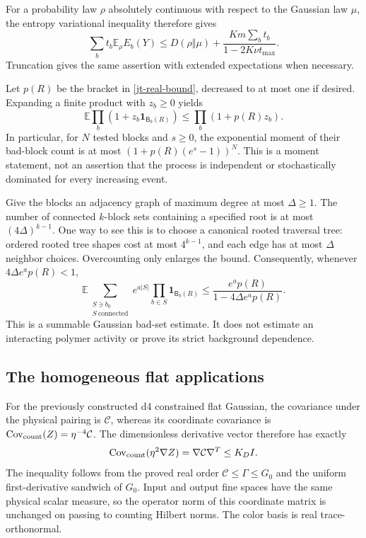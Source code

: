 \documentclass[11pt]{article}
\theoremstyle{remark}
\begin{document}
For a probability law $\rho$ absolutely continuous with respect
to the Gaussian law $\mu$, the entropy variational inequality
therefore gives
\begin{equation}\label{jt-relative-entropy}
 \sum_b t_b\mathbb E_\rho E_b(Y)
 \le D(\rho\Vert\mu)
       +\frac{Km\sum_b t_b}{1-2K\nu t_{\max}}.
\end{equation}
Truncation gives the same assertion with extended expectations
when necessary.

Let $p(R)$ be the bracket in \eqref{jt-real-bound}, decreased
to at most one if desired. Expanding a finite product with
$z_b\ge0$ yields
\begin{equation}\label{jt-bad-count-product}
 \mathbb E\prod_b(1+z_b\mathbf1_{\mathsf B_b(R)})
 \le\prod_b(1+p(R)z_b).
\end{equation}
In particular, for $N$ tested blocks and $s\ge0$, the
exponential moment of their bad-block count is at most
$(1+p(R)(e^s-1))^N$. This is a moment statement, not an
assertion that the process is independent or stochastically
dominated for every increasing event.

Give the blocks an adjacency graph of maximum degree at most
$\Delta\ge1$. The number of connected $k$-block sets containing
a specified root is at most $(4\Delta)^{k-1}$. One way to see
this is to choose a canonical rooted traversal tree: ordered
rooted tree shapes cost at most $4^{k-1}$, and each edge has
at most $\Delta$ neighbor choices. Overcounting only enlarges
the bound. Consequently, whenever $4\Delta e^a p(R)<1$,
\begin{equation}\label{jt-connected-sum}
 \boxed{\quad
 \mathbb E\sum_{\substack{S\ni b_0\\S\ \mathrm{connected}}}
 e^{a|S|}\prod_{b\in S}\mathbf1_{\mathsf B_b(R)}
 \le\frac{e^a p(R)}{1-4\Delta e^a p(R)}.
 \quad}
\end{equation}
This is a summable Gaussian bad-set estimate. It does not
estimate an interacting polymer activity or prove its strict
background dependence.

\subsection{The homogeneous flat applications}
\label{jt-flat-applications}

For the previously constructed d4 constrained flat Gaussian,
the covariance under the physical pairing is $\mathcal C$,
whereas its coordinate covariance is
$\operatorname{Cov}_{\rm count}(Z)=\eta^{-4}\mathcal C$.
The dimensionless derivative vector therefore has exactly
\begin{equation}\label{jt-derivative-covariance}
 \operatorname{Cov}_{\rm count}(\eta^2\nabla Z)
 =\nabla\mathcal C\nabla^T\le K_D I.
\end{equation}
The inequality follows from the proved real order
$\mathcal C\le\Gamma\le G_0$ and the uniform first-derivative
sandwich of $G_0$. Input and output fine spaces have the same
physical scalar measure, so the operator norm of this coordinate
matrix is unchanged on passing to counting Hilbert norms.
The color basis is real trace-orthonormal.
\end{document}
